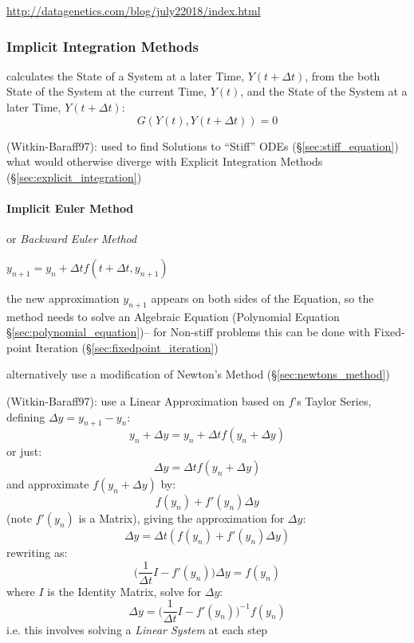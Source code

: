 \url{http://datagenetics.com/blog/july22018/index.html}



\subsubsection{Implicit Integration Methods}\label{sec:implicit_integration}

calculates the State of a System at a later Time, $Y(t + \Delta{t})$, from the
both State of the System at the current Time, $Y(t)$, and the State of the
System at a later Time, $Y(t + \Delta{t})$:
\[
  G(Y(t), Y(t + \Delta{t})) = 0
\]

(Witkin-Baraff97): used to find Solutions to ``Stiff'' ODEs
(\S\ref{sec:stiff_equation}) what would otherwise diverge with Explicit
Integration Methods (\S\ref{sec:explicit_integration})



\paragraph{Implicit Euler Method}\label{sec:implicit_euler}\hfill

or \emph{Backward Euler Method}

$y_{n+1} = y_n + \Delta{t}f(t + \Delta{t}, y_{n+1})$

the new approximation $y_{n+1}$ appears on both sides of the Equation, so the
method needs to solve an Algebraic Equation (Polynomial Equation
\S\ref{sec:polynomial_equation})-- for Non-stiff problems this can be done with
Fixed-point Iteration (\S\ref{sec:fixedpoint_iteration})

alternatively use a modification of Newton's Method (\S\ref{sec:newtons_method})

(Witkin-Baraff97): use a Linear Approximation based on $f$'s Taylor Series,
defining $\Delta{y} = y_{n+1} - y_n$:
\[
  y_n + \Delta{y} = y_n + \Delta{t}f(y_n + \Delta{y})
\]
or just:
\[
  \Delta{y} = \Delta{t}f(y_n + \Delta{y})
\]
and approximate $f(y_n + \Delta{y})$ by:
\[
  f(y_n) + f'(y_n)\Delta{y}
\]
(note $f'(y_n)$ is a Matrix), giving the approximation for $\Delta{y}$:
\[
  \Delta{y} = \Delta{t}(f(y_n) + f'(y_n)\Delta{y})
\]
rewriting as:
\[
  \Big(\frac{1}{\Delta{t}}I - f'(y_n)\Big)\Delta{y} = f(y_n)
\]
where $I$ is the Identity Matrix, solve for $\Delta{y}$:
\[
  \Delta{y} = \Big(\frac{1}{\Delta{t}}I - f'(y_n)\Big)^{-1}f(y_n)
\]
i.e. this involves solving a \emph{Linear System} at each step



